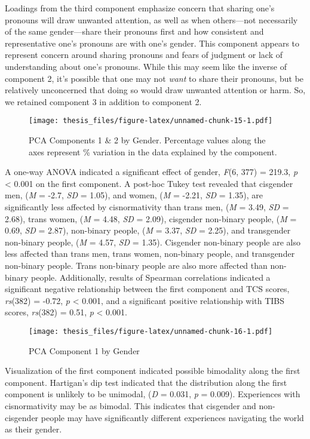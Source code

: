 \documentclass[12pt,twoside]{reedthesis}
\begin{document}
Loadings from the third component emphasize concern that sharing one's pronouns will draw unwanted attention, as well as when others---not necessarily of the same gender---share their pronouns first and how consistent and representative one's pronouns are with one's gender. This component appears to represent concern around sharing pronouns and fears of judgment or lack of understanding about one's pronouns. While this may seem like the inverse of component 2, it's possible that one may not \emph{want} to share their pronouns, but be relatively unconcerned that doing so would draw unwanted attention or harm. So, we retained component 3 in addition to component 2.
\begin{figure}
\centering
\texttt{[image: thesis\_files/figure-latex/unnamed-chunk-15-1.pdf]}
\caption{\label{fig:unnamed-chunk-15}PCA Components 1 \& 2 by Gender. Percentage values along the axes represent \% variation in the data explained by the component.}
\end{figure}
A one-way ANOVA indicated a significant effect of gender, \emph{F}(6, 377) = 219.3, \emph{p} \textless{} 0.001 on the first component. A post-hoc Tukey test revealed that cisgender men, (\emph{M} = -2.7, \emph{SD} = 1.05), and women, (\emph{M} = -2.21, \emph{SD} = 1.35), are significantly less affected by cisnormativity than trans men, (\emph{M} = 3.49, \emph{SD} = 2.68), trans women, (\emph{M} = 4.48, \emph{SD} = 2.09), cisgender non-binary people, (\emph{M} = 0.69, \emph{SD} = 2.87), non-binary people, (\emph{M} = 3.37, \emph{SD} = 2.25), and transgender non-binary people, (\emph{M} = 4.57, \emph{SD} = 1.35). Cisgender non-binary people are also less affected than trans men, trans women, non-binary people, and transgender non-binary people. Trans non-binary people are also more affected than non-binary people. Additionally, results of Spearman correlations indicated a significant negative relationship between the first component and TCS scores, \emph{rs}(382) = -0.72, \emph{p} \textless{} 0.001, and a significant positive relationship with TIBS scores, \emph{rs}(382) = 0.51, \emph{p} \textless{} 0.001.
\begin{figure}
\centering
\texttt{[image: thesis\_files/figure-latex/unnamed-chunk-16-1.pdf]}
\caption{\label{fig:unnamed-chunk-16}PCA Component 1 by Gender}
\end{figure}
Visualization of the first component indicated possible bimodality along the first component. Hartigan's dip test indicated that the distribution along the first component is unlikely to be unimodal, (\emph{D} = 0.031, \emph{p} = 0.009). Experiences with cisnormativity may be as bimodal. This indicates that cisgender and non-cisgender people may have significantly different experiences navigating the world as their gender.
\end{document}
